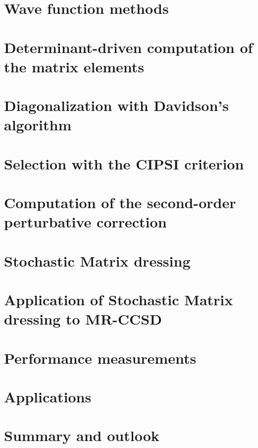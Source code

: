 \documentclass[12pt,a4paper]{report}
\begin{document}
\chapter{Wave function methods}
\minitoc


\chapter{Determinant-driven computation of the matrix elements}
\minitoc


\chapter{Diagonalization with Davidson's algorithm}
\minitoc


\chapter{Selection with the CIPSI criterion}
\minitoc


\chapter{Computation of the second-order perturbative correction}
\minitoc


\chapter{Stochastic Matrix dressing}
\minitoc


\chapter{Application of Stochastic Matrix dressing to MR-CCSD}
\minitoc


\chapter{Performance measurements}
\minitoc


\chapter{Applications}
\minitoc


\chapter{Summary and outlook}
\end{document}
